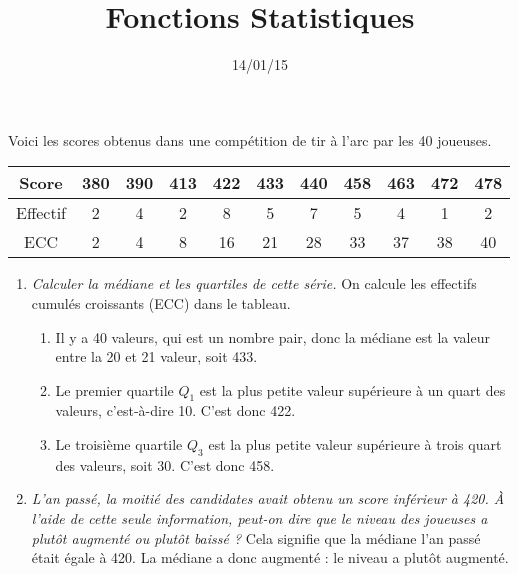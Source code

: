 \documentclass[12pt]{article}
\title{Fonctions Statistiques}
\date{14/01/15}
\begin{document}
\maketitle

\begin{exercice}[Compétition]
  Voici les scores obtenus dans une compétition de tir à l'arc par
  les 40 joueuses.

  \begin{tabular}{c||c|c|c|c|c|c|c|c|c|c}
    Score
    & 380
    & 390
    & 413
    & 422
    & 433
    & 440
    & 458
    & 463
    & 472
    & 478
    \\
    \hline
    Effectif
    & 2
    & 4
    & 2
    & 8
    & 5
    & 7
    & 5
    & 4
    & 1
    & 2
    \\
    \hline
    ECC
    & 2
    & 4
    & 8
    & 16
    & 21
    & 28
    & 33
    & 37
    & 38
    & 40
  \end{tabular}

  \begin{enumerate}
    \item \emph{Calculer la médiane et les quartiles de cette série.}
      On calcule les effectifs cumulés croissants (ECC) dans le tableau.

      \begin{enumerate}
        \item Il y a 40 valeurs, qui est un nombre pair, donc la médiane est la valeur entre la 20 et 21 valeur, soit 433.
        \item Le premier quartile $Q_1$ est la plus petite valeur supérieure à un quart des valeurs, c'est-à-dire 10. C'est donc 422.
        \item Le troisième quartile $Q_3$ est la plus petite valeur supérieure à trois quart des valeurs, soit 30. C'est donc 458.
      \end{enumerate}
  \item \emph{L'an passé, la moitié des candidates avait obtenu un score inférieur à
    420. À l'aide de cette seule information, peut-on dire que le niveau des
  joueuses a plutôt augmenté ou plutôt baissé ?}
  Cela signifie que la médiane l'an passé était égale à 420. La médiane a donc augmenté : le niveau a plutôt augmenté.
  \end{enumerate}

\end{exercice}
\end{document}
